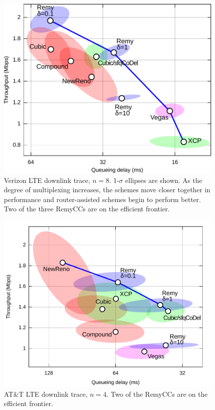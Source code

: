 \begin{figure}
\includegraphics[width=\columnwidth]{vzw-8-final.pdf}
\caption{Verizon LTE downlink trace, $n = 8$. 1-$\sigma$ ellipses are
  shown.  As the degree of multiplexing increases, the schemes move
  closer together in performance and router-assisted schemes begin to
  perform better. Two of the three RemyCCs are on the efficient frontier.}
\label{f:verizon8}
\end{figure}

\begin{figure}
\includegraphics[width=\columnwidth]{att-4-final.pdf}
\caption{AT\&T LTE downlink trace, $n = 4$. Two of the RemyCCs are on
  the efficient frontier.}

\label{f:att2}
\end{figure}

